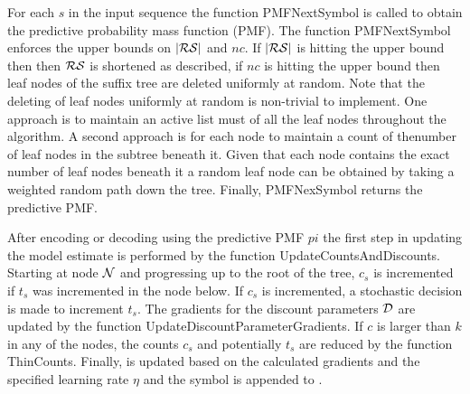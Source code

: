 For each $s$ in the input sequence the function PMFNextSymbol is called to obtain the predictive probability mass function (PMF).  The function PMFNextSymbol enforces the upper bounds on $|\RS|$ and $nc$.  If  $|\RS|$ is hitting the upper bound then then $\RS$ is shortened as described, if $nc$ is hitting the upper bound then leaf nodes of the suffix tree are deleted uniformly at random.  Note that the deleting of leaf nodes uniformly at random is non-trivial to implement. One approach is to maintain an active list must of all the leaf nodes throughout the algorithm. A second approach is for each node to maintain a count of thenumber of leaf nodes in the subtree beneath it.  Given that each node contains the exact number of leaf nodes beneath it a random leaf node can be obtained by taking a weighted random path down the tree.  Finally, PMFNexSymbol returns the predictive PMF.

    After encoding or decoding using the predictive PMF $pi$ the first step in updating the model estimate is performed by the function UpdateCountsAndDiscounts.  Starting at node $\N$ and progressing up to the root of the tree, $c_s$ is incremented if $t_s$ was incremented in the node below.  If $c_s$ is incremented, a stochastic decision is made to increment $t_s$.  The gradients for the discount parameters $\D$ are updated by the function UpdateDiscountParameterGradients.  If $c$ is larger than $k$ in any of the nodes, the counts $c_s$ and potentially $t_s$ are reduced by the function ThinCounts. Finally, \D \space is updated based on the calculated gradients and the specified learning rate $\eta$ and the symbol is appended to \RS.


